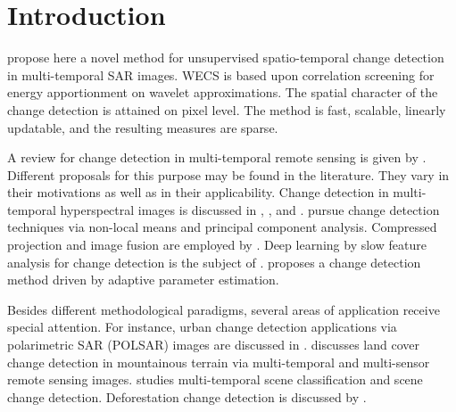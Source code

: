 \documentclass[journal]{IEEEtran}
\begin{document}
%
\IEEEpeerreviewmaketitle



\section{Introduction}
% 
% 
% 
% 
 propose here a novel method for unsupervised spatio-temporal change detection in multi-temporal SAR images. WECS is based upon correlation screening for energy apportionment on wavelet approximations. The spatial character of the change detection is attained on pixel level. The method is fast, scalable, linearly updatable, and the resulting measures are sparse. 

A review for change detection in multi-temporal remote sensing is given by \cite{ban2016change}. 
Different proposals for this purpose may be found  in the literature. They vary in their motivations as well as in their applicability.  Change detection in multi-temporal hyperspectral images is discussed in \cite{bovolo2015time},  \cite{liu2019review}, and \cite{matsunaga2017current}.  \cite{jia2018novel} pursue change detection techniques via non-local means and principal component analysis. Compressed projection and image fusion are employed by \cite{hou2014unsupervised}. Deep learning by slow feature analysis for change detection is the subject of \cite{du2019unsupervised}. \cite{chen2020change} proposes a change detection method driven by adaptive parameter estimation.

Besides different methodological paradigms, several areas of application receive special attention.  For instance, urban change detection applications via polarimetric SAR (POLSAR) images are discussed in \cite{ansari2020urban}. \cite{song2018multi} discusses land cover change detection in mountainous terrain via multi-temporal and multi-sensor remote sensing images. \cite{ru2021multi} studies multi-temporal scene classification and scene change detection. Deforestation change detection is discussed by \cite{barreto2016deforestation}. 
\end{document}

